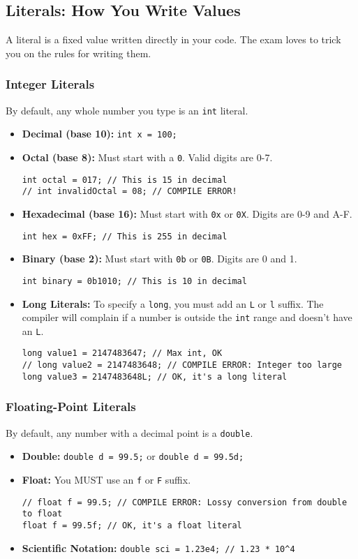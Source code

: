 \documentclass[12pt]{article}
\begin{document}
\begin{enumerate}[label=(\arabic*)]
\subsection*{Literals: How You Write Values}
A literal is a fixed value written directly in your code. The exam loves to trick you on the rules for writing them.

\subsubsection*{Integer Literals}
By default, any whole number you type is an \texttt{int} literal.
\begin{itemize}
\item \textbf{Decimal (base 10):} \texttt{int x = 100;}
\item \textbf{Octal (base 8):} Must start with a \texttt{0}. Valid digits are 0-7.
\begin{verbatim}
int octal = 017; // This is 15 in decimal
// int invalidOctal = 08; // COMPILE ERROR!
\end{verbatim}
\item \textbf{Hexadecimal (base 16):} Must start with \texttt{0x} or \texttt{0X}. Digits are 0-9 and A-F.
\begin{verbatim}
int hex = 0xFF; // This is 255 in decimal
\end{verbatim}
\item \textbf{Binary (base 2):} Must start with \texttt{0b} or \texttt{0B}. Digits are 0 and 1.
\begin{verbatim}
int binary = 0b1010; // This is 10 in decimal
\end{verbatim}
\item \textbf{Long Literals:} To specify a \texttt{long}, you must add an \texttt{L} or \texttt{l} suffix. The compiler will complain if a number is outside the \texttt{int} range and doesn't have an \texttt{L}.
\begin{verbatim}
long value1 = 2147483647; // Max int, OK
// long value2 = 2147483648; // COMPILE ERROR: Integer too large
long value3 = 2147483648L; // OK, it's a long literal
\end{verbatim}
\end{itemize}

\subsubsection*{Floating-Point Literals}
By default, any number with a decimal point is a \texttt{double}.
\begin{itemize}
\item \textbf{Double:} \texttt{double d = 99.5;} or \texttt{double d = 99.5d;}
\item \textbf{Float:} You MUST use an \texttt{f} or \texttt{F} suffix.
\begin{verbatim}
// float f = 99.5; // COMPILE ERROR: Lossy conversion from double to float
float f = 99.5f; // OK, it's a float literal
\end{verbatim}
\item \textbf{Scientific Notation:} \texttt{double sci = 1.23e4; // 1.23 * 10^4}
\end{itemize}


\end{enumerate}
\end{document}
